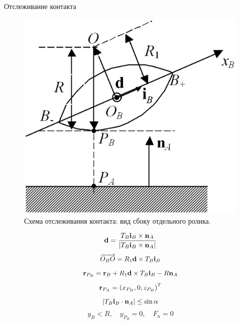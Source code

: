 \documentclass{beamer}
\begin{document}
\begin{frame}{Отслеживание контакта}
        \begin{figure}[htb]
            \centering\includegraphics[width=\textwidth]{content/parts/3_friction/nd/RollerSection_d_ib.png}
            \caption{Схема отслеживания контакта: вид сбоку отдельного ролика.}
            \label{ContactScheme}
        \end{figure}
    \endminipage
        $$ {\bf d}=\dfrac{T_B{\bf i}_B\times {\bf n}_A}{\left| T_B{\bf i}_B\times {\bf n}_A\right|} $$
        $$ \overrightarrow{O_BO}=R_1{\bf d}\times T_B{\bf i}_B $$
        $$ {\bf r}_{P_B}={\bf r}_B+R_1{\bf d}\times T_B{\bf i}_B-R{\bf n}_A $$
        $$ {\bf r}_{P_A}=\left( x_{P_B},0,z_{P_B}\right) ^T $$
        $$ \left| T_B{\bf i}_B\cdot {\bf n}_A\right|\le\sin\alpha $$
        $$ y_B<R, \quad y_{P_B}=0, \quad F_n=0 $$
    \endminipage
\end{frame}
\end{document}
